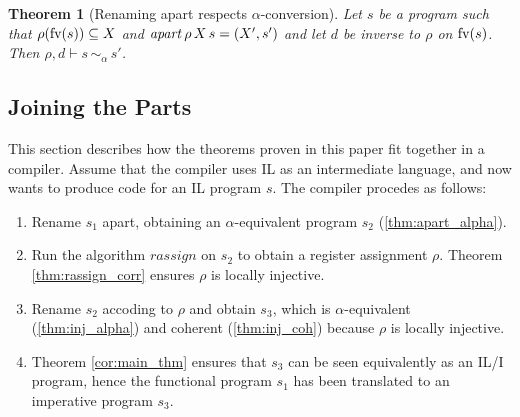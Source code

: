\documentclass[openright,a4paper,11pt]{scrartcl}
\newcommand{\incl}{\ensuremath{\subseteq}}
\newcommand{\fv}{\ensuremath{\textup{fv}}}
\newcommand{\freenam}[1]{\ensuremath{\fv(#1)}}
\newcommand{\myref}[1]{\autoref{#1}}
\newcommand{\alphai}[4]{\ensuremath{#1,#2\vdash#3 \,\sim_\alpha\, #4}}
\newcommand{\rmpp}{\ensuremath{d}}
\theoremstyle{plain}
\newtheorem{theorem}{Theorem}
\theoremstyle{plain}
\theoremstyle{plain}
\theoremstyle{plain}
\theoremstyle{nonumberplain}
\begin{document}
\begin{theorem}[Renaming apart respects $\alpha$-conversion]
\label{thm:apart_alpha}
Let $s$ be a program such that $\rho (\freenam{s}) \incl X$ and $\mathit{apart}\,\rho\,X\,s=(X', s')$ and
let $\rmpp$ be inverse to $\rho$ on $\freenam{s}$.
Then $\alphai{\rho}{\rmpp}{s}{s'}$.
\end{theorem}

 \subsection{Joining the Parts}
This section describes how the theorems proven in this paper fit together in a compiler.
Assume that the compiler uses IL as an intermediate language, and now wants to produce code for an IL program $s$. The compiler procedes as follows:

\begin{enumerate}
 \item Rename $s_1$ apart, obtaining an $\alpha$-equivalent program $s_2$ (\myref{thm:apart_alpha}).
 \item Run the algorithm $\mathit{rassign}$ on $s_2$ to obtain a register assignment $\rho$.
       Theorem \myref{thm:rassign_corr} ensures $\rho$ is locally injective.
 \item Rename $s_2$ accoding to $\rho$ and obtain $s_3$, which is $\alpha$-equivalent
   (\myref{thm:inj_alpha}) and coherent (\myref{thm:inj_coh}) because $\rho$ is locally injective.
 \item Theorem \myref{cor:main_thm} ensures that $s_3$ can be seen equivalently as an IL/I program,
       hence the functional program $s_1$ has been translated to an imperative program $s_3$.
\end{enumerate}

\printbibliography
\end{document}
